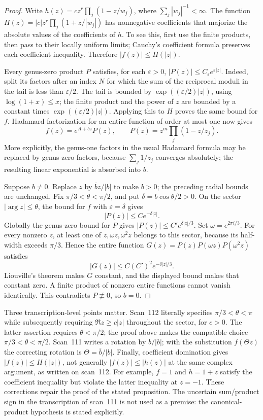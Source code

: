 \begin{proof}
Write $h(z)=c z^r\prod_j(1-z/w_j)$, where
$\sum_j|w_j|^{-1}<\infty$.  The function
$H(z)=|c|z^r\prod_j(1+z/|w_j|)$ has nonnegative coefficients that majorize
the absolute values of the coefficients of $h$.  To see this, first use the
finite products, then pass to their locally uniform limits; Cauchy's
coefficient formula preserves each coefficient inequality.  Therefore
$|f(z)|\leq H(|z|)$.

Every genus-zero product $P$ satisfies, for each $\varepsilon>0$,
$|P(z)|\leq C_\varepsilon e^{\varepsilon|z|}$.  Indeed, split its factors
after an index $N$ for which the sum of the reciprocal moduli in the tail is
less than $\varepsilon/2$.  The tail is bounded by
$\exp((\varepsilon/2)|z|)$, using $\log(1+x)\leq x$; the finite product
and the power of $z$ are bounded by a constant times
$\exp((\varepsilon/2)|z|)$.  Applying this to $H$ proves the same bound
for $f$.  Hadamard factorization for an entire function of order at most one
now gives
\[
 f(z)=e^{A+bz}P(z),\qquad P(z)=z^m\prod_j(1-z/z_j).
\]
More explicitly, the genus-one factors in the usual Hadamard formula may
be replaced by genus-zero factors, because $\sum_j1/z_j$ converges
absolutely; the resulting linear exponential is absorbed into $b$.

Suppose $b\ne0$.  Replace $z$ by $\overline b z/|b|$ to make $b>0$;
the preceding radial bounds are unchanged.  Fix
$\pi/3<\theta<\pi/2$, and put $\delta=b\cos\theta/2>0$.  On the sector
$|\arg z|\leq\theta$, the bound for $f$ with $\varepsilon=\delta$ gives
\[
 |P(z)|\leq C e^{-\delta|z|}.
\]
Globally the genus-zero bound for $P$ gives
$|P(z)|\leq C'e^{\delta|z|/3}$.  Set $\omega=e^{2\pi i/3}$.
For every nonzero $z$, at least one of $z,\omega z,\omega^2z$ belongs
to this sector, because its half-width exceeds $\pi/3$.  Hence the entire
function $G(z)=P(z)P(\omega z)P(\omega^2z)$ satisfies
\[
 |G(z)|\leq C(C')^2e^{-\delta|z|/3}.
\]
Liouville's theorem makes $G$ constant, and the displayed bound makes that
constant zero.  A finite product of nonzero entire functions cannot vanish
identically.  This contradicts $P\not\equiv0$, so $b=0$.
\end{proof}

Three transcription-level points matter.  Scan~112 literally specifies
$\pi/3<\theta<\pi$ while subsequently requiring
$\Re z\geq c|z|$ throughout the sector, for $c>0$.
The latter assertion requires $\theta<\pi/2$; the proof above makes the
compatible choice $\pi/3<\theta<\pi/2$.  Scan~111 writes a rotation by
$b/|b|$; with the substitution $f(\Theta z)$ the correcting rotation is
$\Theta=\overline b/|b|$.  Finally, coefficient domination gives
$|f(z)|\leq H(|z|)$, not generally $|f(z)|\leq|h(z)|$ at the same complex
argument, as written on scan~112.  For example, $f=1$ and $h=1+z$
satisfy the coefficient inequality but violate the latter inequality at
$z=-1$.  These corrections repair the proof of the stated proposition.
The uncertain sum/product sign in the transcription of scan~111 is not
used as a premise: the canonical-product hypothesis is stated explicitly.


